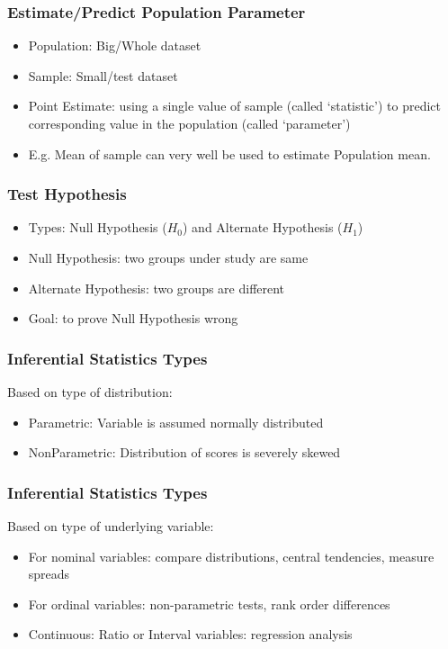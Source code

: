 \begin{frame}[fragile]\frametitle{Estimate/Predict Population Parameter}
\begin{itemize}
\item Population: Big/Whole dataset
\item Sample: Small/test dataset
\item Point Estimate: using a single value of sample (called `statistic') to predict corresponding value in the population (called `parameter')
\item E.g. Mean of sample can very well be used to estimate Population mean.
\end{itemize}
\end{frame}


\begin{frame}[fragile]\frametitle{Test Hypothesis}
\begin{itemize}
\item Types: Null Hypothesis ($H_0$) and Alternate Hypothesis ($H_1$)
\item Null Hypothesis: two groups under study are same
\item Alternate Hypothesis: two groups are different
\item Goal: to prove Null Hypothesis wrong
\end{itemize}
\end{frame}

\begin{frame}[fragile]\frametitle{Inferential Statistics Types}
Based on type of distribution:
\begin{itemize}
\item Parametric: Variable is assumed normally distributed
\item NonParametric: Distribution of scores is severely skewed
\end{itemize}
\end{frame}

\begin{frame}[fragile]\frametitle{Inferential Statistics Types}
Based on type of underlying variable:
\begin{itemize}
\item For nominal variables: compare distributions, central tendencies, measure spreads
\item For ordinal variables: non-parametric tests, rank order differences
\item Continuous: Ratio or Interval variables: regression analysis
\end{itemize}
\end{frame}


